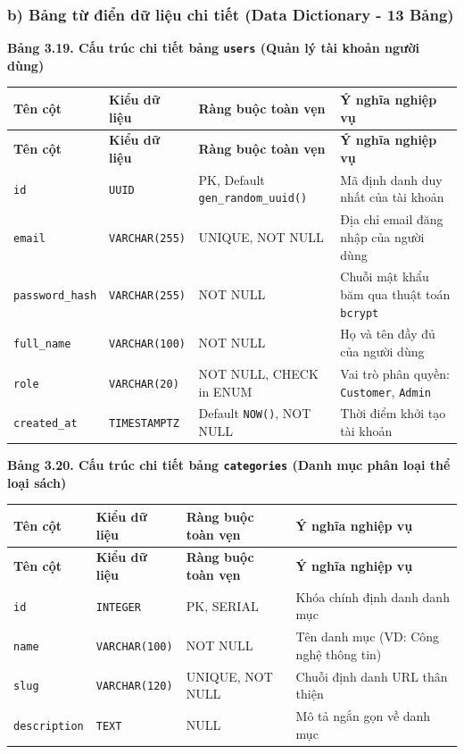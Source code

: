 \documentclass[11pt, a4paper]{report}
\begin{document}
\subsubsection{b) Bảng từ điển dữ liệu chi tiết (Data Dictionary - 13 Bảng)}

\vspace{0.3cm}
\noindent\textbf{Bảng 3.19. Cấu trúc chi tiết bảng \texttt{users} (Quản lý tài khoản người dùng)}

\begin{longtable}{p{3.2cm} p{2.6cm} p{4.0cm} p{4.5cm}}
\toprule
\textbf{Tên cột} & \textbf{Kiểu dữ liệu} & \textbf{Ràng buộc toàn vẹn} & \textbf{Ý nghĩa nghiệp vụ} \\
\midrule
\endfirsthead
\toprule
\textbf{Tên cột} & \textbf{Kiểu dữ liệu} & \textbf{Ràng buộc toàn vẹn} & \textbf{Ý nghĩa nghiệp vụ} \\
\midrule
\endhead
\bottomrule
\endfoot
\texttt{id} & \texttt{UUID} & PK, Default \texttt{gen\_random\_uuid()} & Mã định danh duy nhất của tài khoản \\
\midrule
\texttt{email} & \texttt{VARCHAR(255)} & UNIQUE, NOT NULL & Địa chỉ email đăng nhập của người dùng \\
\midrule
\texttt{password\_hash} & \texttt{VARCHAR(255)} & NOT NULL & Chuỗi mật khẩu băm qua thuật toán \texttt{bcrypt} \\
\midrule
\texttt{full\_name} & \texttt{VARCHAR(100)} & NOT NULL & Họ và tên đầy đủ của người dùng \\
\midrule
\texttt{role} & \texttt{VARCHAR(20)} & NOT NULL, CHECK in ENUM & Vai trò phân quyền: \texttt{Customer}, \texttt{Admin} \\
\midrule
\texttt{created\_at} & \texttt{TIMESTAMPTZ} & Default \texttt{NOW()}, NOT NULL & Thời điểm khởi tạo tài khoản \\
\bottomrule
\end{longtable}

\vspace{0.3cm}
\noindent\textbf{Bảng 3.20. Cấu trúc chi tiết bảng \texttt{categories} (Danh mục phân loại thể loại sách)}

\begin{longtable}{p{3.2cm} p{2.6cm} p{4.0cm} p{4.5cm}}
\toprule
\textbf{Tên cột} & \textbf{Kiểu dữ liệu} & \textbf{Ràng buộc toàn vẹn} & \textbf{Ý nghĩa nghiệp vụ} \\
\midrule
\endfirsthead
\toprule
\textbf{Tên cột} & \textbf{Kiểu dữ liệu} & \textbf{Ràng buộc toàn vẹn} & \textbf{Ý nghĩa nghiệp vụ} \\
\midrule
\endhead
\bottomrule
\endfoot
\texttt{id} & \texttt{INTEGER} & PK, SERIAL & Khóa chính định danh danh mục \\
\midrule
\texttt{name} & \texttt{VARCHAR(100)} & NOT NULL & Tên danh mục (VD: Công nghệ thông tin) \\
\midrule
\texttt{slug} & \texttt{VARCHAR(120)} & UNIQUE, NOT NULL & Chuỗi định danh URL thân thiện \\
\midrule
\texttt{description} & \texttt{TEXT} & NULL & Mô tả ngắn gọn về danh mục \\
\bottomrule
\end{longtable}
\end{document}
